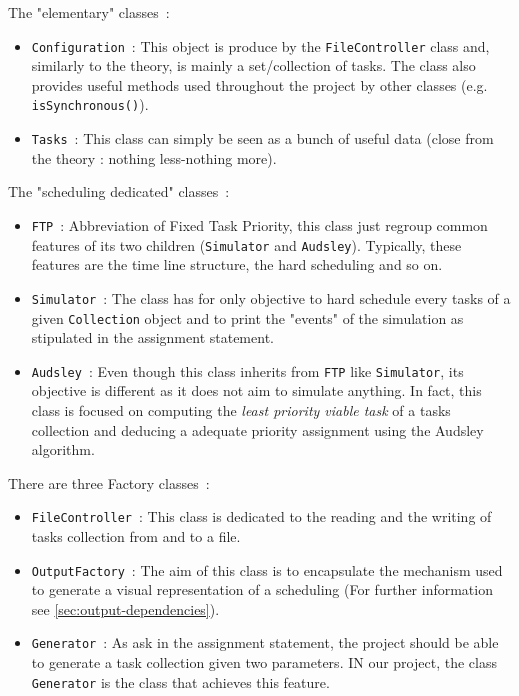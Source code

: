 \documentclass[a4paper,11pt]{article}
\begin{document}
  \noindent The "elementary" classes~:
  \begin{itemize}
    \item \verb|Configuration|~: This object is produce by the \verb|FileController| class and, similarly to the theory, is mainly a set/collection of tasks. The class also provides useful methods used throughout the project by other classes (e.g. \verb|isSynchronous()|).
    \item \verb|Tasks|~: This class can simply be seen as a bunch of useful data (close from the theory : nothing less-nothing more).
  \end{itemize}
  The "scheduling dedicated" classes~:
  \begin{itemize}
    \item \verb|FTP|~: Abbreviation of Fixed Task Priority, this class just regroup common features of its two children (\verb|Simulator| and \verb|Audsley|). Typically, these features are the time line structure, the hard scheduling and so on.
    \item \verb|Simulator|~: The class has for only objective to hard schedule every tasks of a given \verb|Collection| object and to print the "events" of the simulation as stipulated in the assignment statement.
    \item \verb|Audsley|~: Even though this class inherits from \verb|FTP| like \verb|Simulator|, its objective is different as it does not aim to simulate anything. In fact, this class is focused on computing the \textit{least priority viable task} of a tasks collection and deducing a adequate priority assignment using the Audsley algorithm.
  \end{itemize}
  There are three Factory classes~:
  \begin{itemize}
    \item \verb|FileController|~: This class is dedicated to the reading and the writing of tasks collection from and to a file.
    \item \verb|OutputFactory|~: The aim of this class is to encapsulate the mechanism used to generate a visual representation of a scheduling (For further information see \ref{sec:output-dependencies}).
    \item \verb|Generator|~: As ask in the assignment statement, the project should be able to generate a task collection given two parameters. IN our project, the class \verb|Generator| is the class that achieves this feature.
  \end{itemize}
\end{document}
